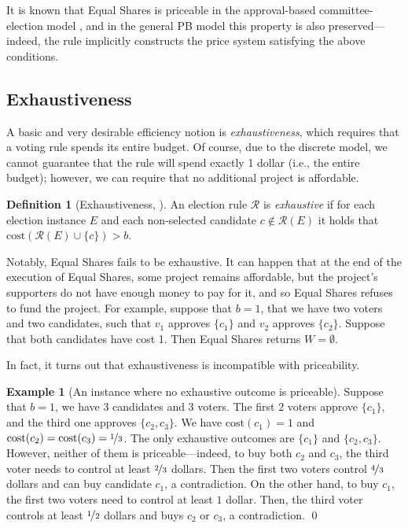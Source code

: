 \documentclass[10pt]{scrartcl}
\newcommand{\myemph}[1]{{\color{winered}\emph{#1}}}
\newcommand{\cost}{{{\mathrm{cost}}}}
\newcommand{\calR}{{{\mathcal{R}}}}
\theoremstyle{definition}
\newtheorem{definition}{Definition}
\newtheorem{example}{Example}
\theoremstyle{plain}
\begin{document}
It is known that Equal Shares is priceable in the approval-based committee-election model \citep{pet-sko:laminar}, and in the general PB model this property is also preserved---indeed, the rule implicitly constructs the price system satisfying the above conditions.

\subsection{Exhaustiveness}\label{sec:exhaustiveness}

A basic and very desirable efficiency notion is \emph{exhaustiveness}, which requires that a voting rule spends its entire budget. Of course, due to the discrete model, we cannot guarantee that the rule will spend exactly 1 dollar (i.e., the entire budget); however, we can require that no additional project is affordable.

\begin{definition}[Exhaustiveness, \citealp{aziz2018proportionally}]\label{def:exhaustivness}
An election rule $\calR$ is \myemph{exhaustive} if for each election instance $E$ and each non-selected candidate $c \notin \calR(E)$ it holds that $\cost(\calR(E) \cup \{c\}) > b$. 
\end{definition}

Notably, Equal Shares fails to be exhaustive. It can happen that at the end of the execution of Equal Shares, some project remains affordable, but the project's supporters do not have enough money to pay for it, and so Equal Shares refuses to fund the project. For example, suppose that $b = 1$, that we have two voters and two candidates, such that $v_1$ approves $\{c_1\}$ and $v_2$ approves $\{c_2\}$. Suppose that both candidates have cost 1. Then Equal Shares returns $W = \emptyset$.

In fact, it turns out that exhaustiveness is incompatible with priceability.

\begin{example}[An instance where no exhaustive outcome is priceable]
	\label{ex:priceability_vs_exhaustiveness}
	Suppose that $b = 1$, we have 3 candidates and 3 voters. The first 2 voters approve $\{c_1\}$, and the third one approves $\{c_2, c_3\}$. We have $\cost(c_1) = 1$ and $\cost(c_2) = \cost(c_3) = \nicefrac{1}{3}$. The only exhaustive outcomes are $\{c_1\}$ and $\{c_2, c_3\}$. However, neither of them is priceable---indeed, to buy both $c_2$ and $c_3$, the third voter needs to control at least $\nicefrac{2}{3}$ dollars. Then the first two voters control  $\nicefrac{4}{3}$ dollars and can buy candidate $c_1$, a contradiction. On the other hand, to buy $c_1$, the first two voters need to control at least $1$ dollar. Then, the third voter controls at least $\nicefrac{1}{2}$ dollars and buys $c_2$ or $c_3$, a contradiction. \qed
\end{example}
\end{document}
